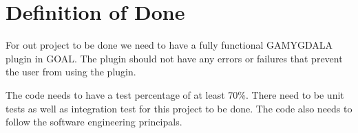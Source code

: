\section{Definition of Done}
For out project to be done we need to have a fully functional GAMYGDALA plugin in GOAL. The plugin should not have any errors or failures that prevent the user from using the plugin. \\ \par
The code needs to have a test percentage of at least 70\%. There need to be unit tests as well as integration test for this project to be done. The code also needs to follow the software engineering principals.